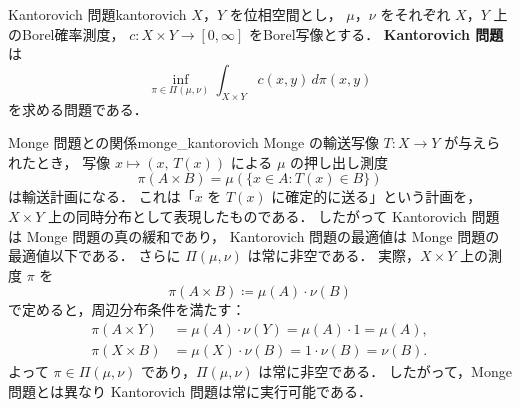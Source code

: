 \documentclass[uplatex, dvipdfmx]{jsarticle}
\begin{document}
\begin{definition}{Kantorovich 問題}{kantorovich}
$X$，$Y$ を位相空間とし，
$\mu$，$\nu$ をそれぞれ $X$，$Y$ 上のBorel確率測度，
$c\colon X\times Y\to[0,\infty]$ をBorel写像とする．
\textbf{Kantorovich 問題}は
\[
  \inf_{\pi\in\Pi(\mu,\nu)}
  \int_{X\times Y} c(x,y)\,d\pi(x,y)
\]
を求める問題である．
\end{definition}

\begin{remark}{Monge 問題との関係}{monge_kantorovich}
Monge の輸送写像 $T\colon X\to Y$ が与えられたとき，
写像 $x\mapsto(x,\,T(x))$ による $\mu$ の押し出し測度
\[
  \pi(A\times B) = \mu(\{x\in A : T(x)\in B\})
\]
は輸送計画になる．
これは「$x$ を $T(x)$ に確定的に送る」という計画を，
$X\times Y$ 上の同時分布として表現したものである．
したがって Kantorovich 問題は Monge 問題の真の緩和であり，
Kantorovich 問題の最適値は Monge 問題の最適値以下である．
さらに $\Pi(\mu,\nu)$ は常に非空である．
実際，$X\times Y$ 上の測度 $\pi$ を
\[
  \pi(A\times B) \coloneqq \mu(A)\cdot\nu(B)
\]
で定めると，周辺分布条件を満たす：
\begin{align*}
  \pi(A\times Y) &= \mu(A)\cdot\nu(Y) = \mu(A)\cdot 1 = \mu(A), \\
  \pi(X\times B) &= \mu(X)\cdot\nu(B) = 1\cdot\nu(B) = \nu(B).
\end{align*}
よって $\pi\in\Pi(\mu,\nu)$ であり，$\Pi(\mu,\nu)$ は常に非空である．
したがって，Monge 問題とは異なり Kantorovich 問題は常に実行可能である．
\end{remark}
\end{document}
